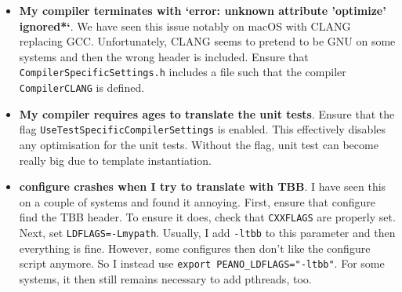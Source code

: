 \begin{itemize}
  \item \textbf{ My compiler terminates with `error: unknown
   attribute 'optimize' ignored*`}. We have seen this issue notably on macOS
   with CLANG replacing GCC. Unfortunately, CLANG seems to pretend to be GNU on
   some systems and then the wrong header is included. Ensure that
   \texttt{CompilerSpecificSettings.h} includes a file such that the compiler
   \linebreak
   \texttt{CompilerCLANG} is defined.
  \item \textbf{ My compiler requires ages to translate the unit tests}. Ensure
  that the flag \linebreak \texttt{UseTestSpecificCompilerSettings} is enabled.
  This effectively disables any optimisation for the unit tests. Without the
  flag, unit test can become really big due to template instantiation.
  \item \textbf{configure crashes when I try to translate with TBB}. I have seen
  this on a couple of systems and found it annoying. First, ensure that configure
  find the TBB header. To ensure it does, check that \texttt{CXXFLAGS} are properly
		set. Next, set \texttt{LDFLAGS=-Lmypath}. Usually, I add \texttt{-ltbb} to 
  this parameter and then everything is fine. However, some configures then don't 
  like the configure script anymore. So I instead use \texttt{export PEANO\_LDFLAGS="-ltbb"}. 
  For some systems, it then still remains necessary to add pthreads, too.
\end{itemize}



